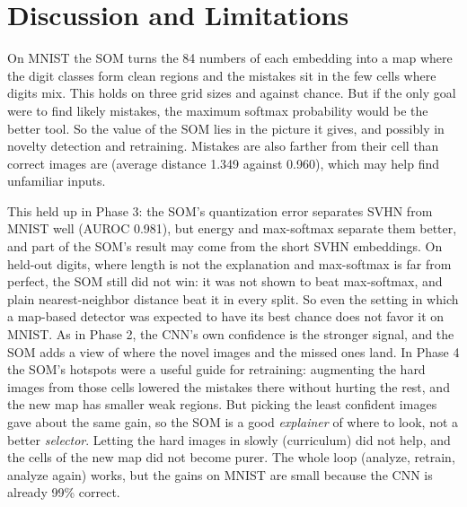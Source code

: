 \documentclass[11pt]{article}
\begin{document}
\section{Discussion and Limitations}

On MNIST the SOM turns the 84 numbers of each embedding into a map where the digit classes form clean regions and the mistakes sit in the few cells where digits mix. This holds on three grid sizes and against chance.
But if the only goal were to find likely mistakes, the maximum softmax probability would be the better tool. So the value of the SOM lies in the picture it gives, and possibly in novelty detection and retraining.
Mistakes are also farther from their cell than correct images are (average distance 1.349 against 0.960), which may help find unfamiliar inputs.

This held up in Phase 3: the SOM's quantization error separates SVHN from MNIST well (AUROC 0.981), but energy and max-softmax separate them better, and part of the SOM's result may come from the short SVHN embeddings. On held-out digits, where length is not the explanation and max-softmax is far from perfect, the SOM still did not win: it was not shown to beat max-softmax, and plain nearest-neighbor distance beat it in every split. So even the setting in which a map-based detector was expected to have its best chance does not favor it on MNIST. As in Phase 2, the CNN's own confidence is the stronger signal, and the SOM adds a view of where the novel images and the missed ones land.
In Phase 4 the SOM's hotspots were a useful guide for retraining: augmenting the hard images from those cells lowered the mistakes there without hurting the rest, and the new map has smaller weak regions. But picking the least confident images gave about the same gain, so the SOM is a good \emph{explainer} of where to look, not a better \emph{selector}.
Letting the hard images in slowly (curriculum) did not help, and the cells of the new map did not become purer. The whole loop (analyze, retrain, analyze again) works, but the gains on MNIST are small because the CNN is already 99\% correct.
\end{document}
